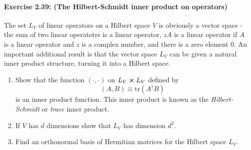 \paragraph{\cite{mikeandike} Exercise 2.39: (The Hilbert-Schmidt inner product
on operators)} The set $L_V$ of linear operators on a Hilbert space $V$ is
obviously a vector space - the sum of two linear operatotrs is a linear
operator, $zA$ is a linear operator if $A$ is a linear operator and $z$ is a
complex number, and there is a zero element 0. An important additional result
is that the vector space $L_V$ can be given a natural inner product structure,
turning it into a Hilbert space. \begin{enumerate}
  \item Show that the function $(\cdot, \cdot)$ on $L_V \cross L_V$ defined by
    \begin{equation}
      (A, B) \equiv \mathrm{tr}(A^\dagger B) \label{eq:hs-inn-prod}
    \end{equation}
    is an inner product function. This inner product is known as the
    \emph{Hilbert-Schmidt} or \emph{trace} inner product.
  \item If $V$ has $d$ dimensions show that $L_V$ has dimension $d^2$.
  \item Find an orthonormal basis of Hermitian matrices for the Hilbert space
    $L_V$.
\end{enumerate}

